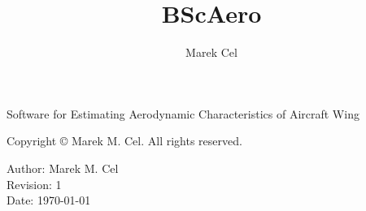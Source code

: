 \documentclass[12pt,a4paper]{report}
\title{BScAero}
\author{Marek Cel}
\date{}
\begin{document}
  
  \begin{titlepage}
    \centering
    {\huge \@title}
    \par Software for Estimating Aerodynamic Characteristics of Aircraft Wing\par
  \end{titlepage}
  

  \noindent Copyright \copyright{} \the\year{} Marek M. Cel. All rights reserved.

  \noindent Author: Marek M. Cel \\
  Revision: 1 \\
  Date: \today

  
  
  {
    \clearpage
    \setlength{\parskip}{0em}
    \tableofcontents
  }
  
  
  
  
  
  
  

  
  \clearpage
   
  
  
\end{document}
